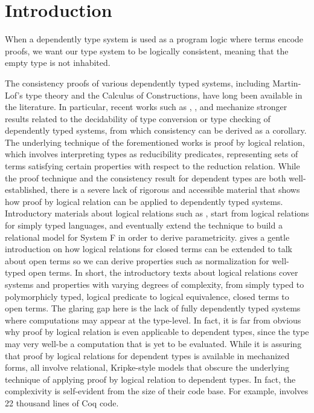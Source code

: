 \documentclass[nonacm]{acmart}
\begin{document}
\section{Introduction}
When a dependently type system is used as a program logic where terms
encode proofs, we want our type system to be logically consistent,
meaning that the empty type is not inhabited.

The consistency proofs of various dependently typed systems, including Martin-Lof's
type theory and the Calculus of Constructions, have long been
available in the literature. In particular, recent works such as \citet{nbeincoq},
\citet{decagda}, and \citet{martin-lof-a-la-coq} mechanize stronger
results related to the decidability of type conversion or type
checking of dependently typed systems, from which consistency can be
derived as a corollary. The underlying technique of the forementioned
works is proof by logical relation,
which involves interpreting types as reducibility predicates,
representing sets of terms satisfying certain properties with respect
to the reduction relation. While the proof technique and the
consistency result for dependent types are both well-established,
there is a severe lack of rigorous and accessible material that shows
how proof by logical relation can be applied to dependently typed
systems.
Introductory materials about logical relations such as
\citet{skorstengaard2019introduction}, \citet{harper2016practical}
start from logical relations for simply typed languages, and
eventually extend the technique to build a relational model for System
F in order to derive
parametricity. \citet{harperkripke} gives a gentle introduction on how
logical relations for closed terms can be extended to talk about open
terms so we can derive properties such as normalization for well-typed
open terms. In short, the introductory texts about logical relations
cover systems and properties with varying degrees of complexity, from
simply typed to polymorphicly typed, logical predicate to logical
equivalence, closed terms to open terms. The glaring gap here is the
lack of fully dependently typed systems where computations may appear
at the type-level. In fact, it is far from obvious why proof by
logical relation is even applicable to dependent types, since the type
may very well-be a computation that is yet to be evaluated.
While it is assuring that proof by logical relations for dependent
types is available in mechanized forms, %
\citet{nbeincoq,decagda,martin-lof-a-la-coq} all involve relational,
Kripke-style models that obscure the underlying technique of applying
proof by logical relation to dependent types. In fact, the
complexivity is self-evident from the size of their code base. For
example, \citet{nbeincoq} involves 22 thousand lines of Coq code.
\end{document}
